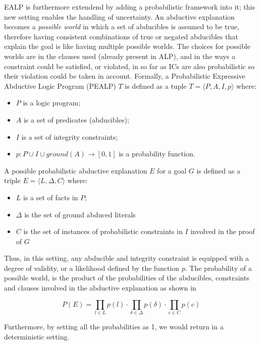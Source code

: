 EALP is furthermore extendend by adding a probabilistic framework into it; this new setting enables the handling of uncertainty. An abductive explanation becomes a \textit{possible world} in which a set of abducibles is assumed to be true, therefore having consistent combinations of true or negated abducibles that explain the goal is like having multiple possible worlds. The choices for possible worlds are in the clauses used (already present in ALP), and in the ways a constraint could be satisfied, or violated, in so far as ICs are also probabilistic so their violation could be taken in account.
Formally, a Probabilistic Expressive Abductive Logic Program (PEALP) $T$ is defined as a tuple $T = \langle P, A, I, p \rangle$ where:
\begin{itemize}
    \item $P$ is a logic program;
    \item $A$ is a set of predicates (abducibles);
    \item $I$ is a set of integrity constraints;
    \item $p: P \cup I \cup ground(A) \to [0,1]$ is a probability function.
\end{itemize}
A possible probabilistic abductive explanation $E$ for a goal $G$ is defined as a triple $E = \langle L, \Delta, C \rangle$ where:
\begin{itemize}
    \item $L$ is a set of facts in $P$;
    \item $\Delta$ is the set of ground abduced literals
    \item $C$ is the set of instances of probabilistic constraints in $I$ involved in the proof of $G$
\end{itemize}

Thus, in this setting, any abducible and integrity constraint is equipped with a degree of validity, or a likelihood defined by the function $p$. The probability of a possible world, is the product of the probabilities of the abducibles, constraints and clauses involved in the abductive explanation as shown in 

\begin{equation}
    P(E) = \prod_{l \in L} p(l) \cdot \prod_{\delta \in \Delta} p(\delta) \cdot \prod_{c \in C} p(c)
    \label{eq:p_world}
\end{equation}

Furthermore, by setting all the probabilities as 1, we would return in a deterministic setting.